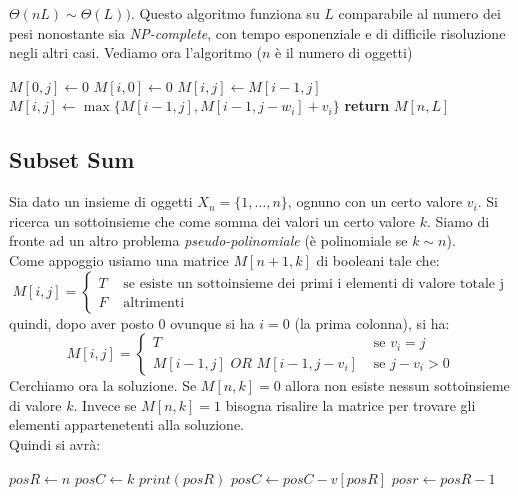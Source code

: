 \documentclass[a4paper,12pt, oneside]{book}
\begin{document}
$\Theta(nL)\sim \Theta(L))$. Questo algoritmo funziona su $L$
comparabile al numero dei pesi nonostante sia
\textit{NP-complete}, con tempo esponenziale e di difficile
risoluzione negli altri casi. Vediamo ora l'algoritmo ($n$ è il numero
di oggetti)
\begin{shaded}
  \begin{algorithmic}
    \State $M[0,j]\gets 0$
    \EndFor
    \State $M[i,0]\gets 0$
    \EndFor
    \State $M[i,j]\gets M[i-1,j]$
    \Else
    \State $M[i,j]\gets \max\{M[i-1,j],M[i-1,j-w_i]+v_i\}$
    \EndIf
    \EndFor
    \EndFor
    \State \textbf{return} $M[n,L]$
    \EndFunction
  \end{algorithmic}
\end{shaded}
\subsection{Subset Sum}
Sia dato un insieme di oggetti $X_n=\{1,\ldots, n\}$, ognuno con un
certo valore $v_i$. Si ricerca un sottoinsieme che come somma dei
valori un certo valore $k$. Siamo di fronte ad un altro problema
\textit{pseudo-polinomiale} (è polinomiale se $k\sim n$).\\
Come appoggio usiamo una matrice $M[n+1,k]$ di booleani tale che:
\[M[i,j]=
  \begin{cases}
    T & \mbox{ se esiste un sottoinsieme dei primi i elementi di
      valore totale j}\\
    F & \mbox{ altrimenti}
  \end{cases}
\]
quindi, dopo aver posto $0$ ovunque si ha $i=0$ (la prima colonna), si
ha:
\[M[i,j]=
  \begin{cases}
    T & \mbox{ se } v_i=j\\
    M[i-1,j]\,\,OR\,\, M[i-1,j-v_i] & \mbox{ se } j-v_i>0
  \end{cases}
\]
Cerchiamo ora la soluzione. Se $M[n,k]=0$ allora non esiste nessun
sottoinsieme di valore $k$. Invece se $M[n,k]=1$ bisogna risalire la
matrice per trovare gli elementi appartenetenti alla soluzione.\\
Quindi si avrà:
\begin{shaded}
  \begin{algorithmic}
    \State $posR\gets n$
    \State $posC\gets k$
    \State $print(posR)$
    \State $posC\gets posC - v[posR]$
    \EndIf
    \State $posr \gets posR-1$
    \EndWhile
  \end{algorithmic}
\end{shaded}
\end{document}
